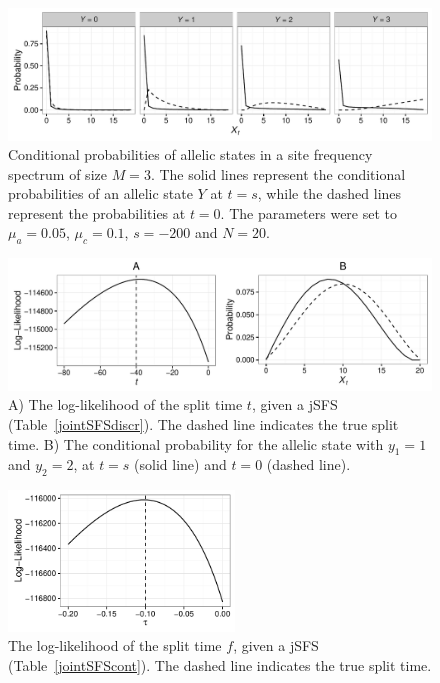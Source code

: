\documentclass[preprint]{elsarticle}
\newcommand\y{\ensuremath{Y}}
\begin{document}
\begin{figure}[ht]
\includegraphics[width = 12cm]{cProb.pdf}
\caption{Conditional probabilities of allelic states in a site frequency spectrum of size $M=3$. The solid lines represent the conditional probabilities of an allelic state $\y$ at $t=s$, while the dashed lines represent the probabilities at $t=0$. The parameters were set to $\mu_a=0.05$, $\mu_c=0.1$, $s=-200$ and $N=20$.}\label{cProb}
\end{figure}

\begin{figure}[ht]
\includegraphics[width = 12cm]{twoPop_29_8_2016.pdf}
\caption{A) The log-likelihood of the split time $t$, given a jSFS (Table~\ref{jointSFSdiscr}). The dashed line indicates the true split time. B) The conditional probability for the allelic state with $y_1=1$ and $y_2=2$, at $t=s$ (solid line) and $t=0$ (dashed line).}\label{twoPopdiscr}
\end{figure}

\begin{figure}[ht]
\includegraphics[width = 6cm]{forw_back_ll_cont.pdf}
\caption{The log-likelihood of the split time $f$, given a jSFS (Table~\ref{jointSFScont}). The dashed line indicates the true split time.}\label{twoPopcont}
\end{figure}

\clearpage
\end{document}
